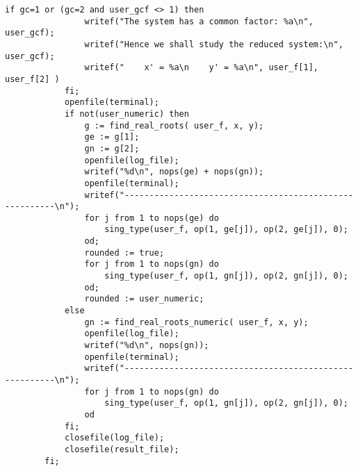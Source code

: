 \documentclass[a4paper,10pt]{article}
\begin{document}
\begin{lstlisting}[name=main]
            if gc=1 or (gc=2 and user_gcf <> 1) then
                writef("The system has a common factor: %a\n", user_gcf);
                writef("Hence we shall study the reduced system:\n", user_gcf);
                writef("    x' = %a\n    y' = %a\n", user_f[1], user_f[2] )
            fi;
            openfile(terminal);
            if not(user_numeric) then
                g := find_real_roots( user_f, x, y);
                ge := g[1];
                gn := g[2];
                openfile(log_file);
                writef("%d\n", nops(ge) + nops(gn));
                openfile(terminal);
                writef("--------------------------------------------------------\n");
                for j from 1 to nops(ge) do
                    sing_type(user_f, op(1, ge[j]), op(2, ge[j]), 0);
                od;
                rounded := true;
                for j from 1 to nops(gn) do
                    sing_type(user_f, op(1, gn[j]), op(2, gn[j]), 0);
                od;
                rounded := user_numeric;
            else
                gn := find_real_roots_numeric( user_f, x, y);
                openfile(log_file);
                writef("%d\n", nops(gn));
                openfile(terminal);
                writef("--------------------------------------------------------\n");
                for j from 1 to nops(gn) do
                    sing_type(user_f, op(1, gn[j]), op(2, gn[j]), 0);
                od
            fi;
            closefile(log_file);
            closefile(result_file);
        fi;


\end{lstlisting}
\end{document}
